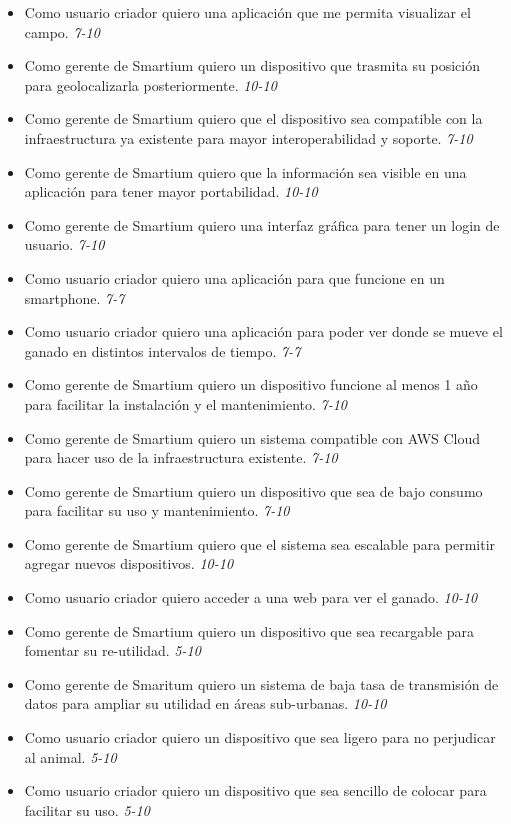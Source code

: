 \documentclass[11pt]{charter}
\begin{document}
\begin{itemize}
\item Como usuario criador quiero una aplicación que me permita visualizar el campo. \textit{7-10}
\item Como gerente de Smartium quiero un dispositivo que trasmita su posición para geolocalizarla posteriormente. \textit{10-10}
\item Como gerente de Smartium quiero que el dispositivo sea compatible con la infraestructura ya existente para mayor interoperabilidad y soporte. \textit{7-10}
\item Como gerente de Smartium quiero que la información sea visible en una aplicación para tener mayor portabilidad. \textit{10-10}
\item Como gerente de Smartium quiero una interfaz gráfica para tener un login de usuario. \textit{7-10}
\item Como usuario criador quiero una aplicación para que funcione en un smartphone. \textit{7-7}
\item Como usuario criador quiero una aplicación para poder ver donde se mueve el ganado en distintos intervalos de tiempo. \textit{7-7}
\item Como gerente de Smartium quiero un dispositivo funcione al menos 1 año para facilitar la instalación y el mantenimiento. \textit{7-10}
\item Como gerente de Smartium quiero un sistema compatible con AWS Cloud para hacer uso de la infraestructura existente. \textit{7-10}
\item Como gerente de Smartium quiero un dispositivo que sea de bajo consumo para facilitar su uso y mantenimiento. \textit{7-10}
\item Como gerente de Smartium quiero que el sistema sea escalable para permitir agregar nuevos dispositivos. \textit{10-10}
\item Como usuario criador quiero acceder a una web para ver el ganado. \textit{10-10}
\item Como gerente de Smartium quiero un dispositivo que sea recargable para fomentar su re-utilidad. \textit{5-10}
\item Como gerente de Smaritum quiero un sistema de baja tasa de transmisión de datos para ampliar su utilidad en áreas sub-urbanas. \textit{10-10}
\item Como usuario criador quiero un dispositivo que sea ligero para no perjudicar al animal. \textit{5-10}
\item Como usuario criador quiero un dispositivo que sea sencillo de colocar para facilitar su uso. \textit{5-10}

\end{itemize}
\end{document}
